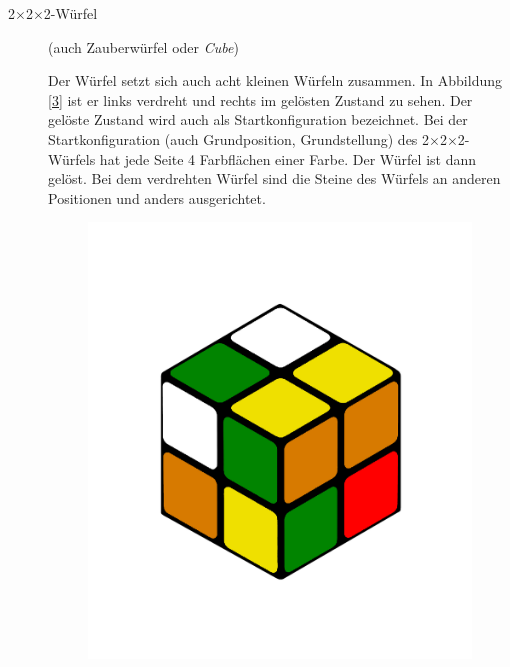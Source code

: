 \documentclass[12pt,a4paper, usenames, dvipsnames]{article}
\newcommand{\Ttwo}{2$\times$2$\times$2-}
\begin{document}
\begin{description}


\item[\Ttwo Würfel] (auch Zauberwürfel oder \textit{Cube}) 

Der Würfel setzt sich auch acht kleinen Würfeln zusammen.
In Abbildung \ref{3} ist er links verdreht und rechts im gelösten Zustand zu sehen. Der gelöste Zustand wird auch als Startkonfiguration bezeichnet.
Bei der Startkonfiguration (auch Grundposition, Grundstellung) des \Ttwo Würfels hat jede Seite 4 Farbflächen einer Farbe. Der Würfel ist dann gelöst.  
Bei dem verdrehten Würfel sind die Steine des Würfels an anderen Positionen und anders ausgerichtet.
\begin{figure}[h]
\centering
\includegraphics[scale=0.1]{2x2scrambled.png}

\end{figure}
\end{description}
\end{document}

